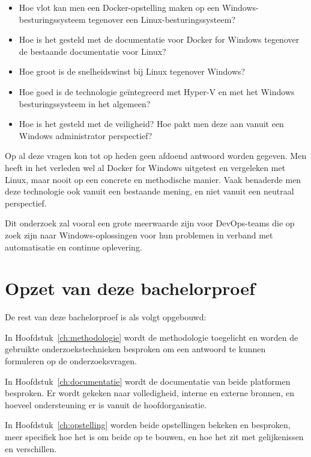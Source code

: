 \begin{itemize}[noitemsep]
	\item Hoe vlot kan men een Docker-opstelling maken op een Windows-besturingssysteem tegenover een Linux-besturingssysteem?
	\item Hoe is het gesteld met de documentatie voor Docker for Windows tegenover de bestaande documentatie voor Linux?
	\item Hoe groot is de snelheidswinst bij Linux tegenover Windows?
	\item Hoe goed is de technologie geïntegreerd met Hyper-V en met het Windows besturingssysteem in het algemeen?
	\item Hoe is het gesteld met de veiligheid? Hoe pakt men deze aan vanuit een Windows administrator perspectief?
\end{itemize}

Op al deze vragen kon tot op heden geen afdoend antwoord worden gegeven. Men heeft in het verleden wel al Docker for Windows uitgetest en vergeleken met Linux, maar nooit op een concrete en methodische manier. Vaak benaderde men deze technologie ook vanuit een bestaande mening, en niet vanuit een neutraal perspectief.

Dit onderzoek zal vooral een grote meerwaarde zijn voor DevOps-teams die op zoek zijn naar Windows-oplossingen voor hun problemen in verband met automatisatie en continue oplevering.

\section{Opzet van deze bachelorproef}
\label{sec:opzet-bachelorproef}


De rest van deze bachelorproef is als volgt opgebouwd:

In Hoofdstuk~\ref{ch:methodologie} wordt de methodologie toegelicht en worden de gebruikte onderzoekstechnieken besproken om een antwoord te kunnen formuleren op de onderzoeksvragen.

In Hoofdstuk~\ref{ch:documentatie} wordt de documentatie van beide platformen besproken. Er wordt gekeken naar volledigheid, interne en externe bronnen, en hoeveel ondersteuning er is vanuit de hoofdorganisatie.

In Hoofdstuk~\ref{ch:opstelling} worden beide opstellingen bekeken en besproken, meer specifiek hoe het is om beide op te bouwen, en hoe het zit met gelijkenissen en verschillen.

